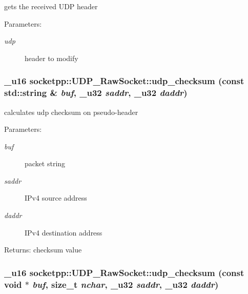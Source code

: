 gets the received UDP header 

\begin{Desc}
\item[Parameters:]
\begin{description}
\item[{\em udp}]header to modify \end{description}
\end{Desc}
\hypertarget{classsocketpp_1_1UDP__RawSocket_166b30d9061b06336dc637cd3a25d12f}{
\subsubsection[{udp\_\-checksum}]{\setlength{\rightskip}{0pt plus 5cm}\_\-u16 socketpp::UDP\_\-RawSocket::udp\_\-checksum (const std::string \& {\em buf}, \/  \_\-u32 {\em saddr}, \/  \_\-u32 {\em daddr})}}
\label{classsocketpp_1_1UDP__RawSocket_166b30d9061b06336dc637cd3a25d12f}


calculates udp checksum on pseudo-header 

\begin{Desc}
\item[Parameters:]
\begin{description}
\item[{\em buf}]packet string \item[{\em saddr}]IPv4 source address \item[{\em daddr}]IPv4 destination address \end{description}
\end{Desc}
\begin{Desc}
\item[Returns:]checksum value \end{Desc}
\hypertarget{classsocketpp_1_1UDP__RawSocket_fdc782d0436fd9c6d24520034d445063}{
\subsubsection[{udp\_\-checksum}]{\setlength{\rightskip}{0pt plus 5cm}\_\-u16 socketpp::UDP\_\-RawSocket::udp\_\-checksum (const void $\ast$ {\em buf}, \/  size\_\-t {\em nchar}, \/  \_\-u32 {\em saddr}, \/  \_\-u32 {\em daddr})}}
\label{classsocketpp_1_1UDP__RawSocket_fdc782d0436fd9c6d24520034d445063}


